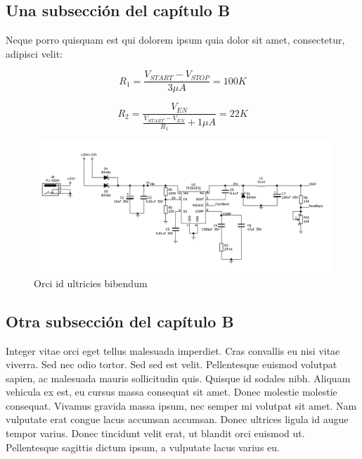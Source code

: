 \subsection{Una subsecci\'on del cap\'itulo B}		
Neque porro quisquam est qui dolorem ipsum quia dolor sit amet, consectetur, adipisci velit:
		
\begin{equation}
	R_{1} = \frac{V_{START} - V_{STOP}}{3 \mu A} = 100K
\end{equation}
		
\begin{equation}
	R_{2} = \frac{V_{EN}}{\frac{V_{START} - V_{EN}}{R_{1}} + 1 \mu A} = 22K
\end{equation}

\begin{figure}[h]
    \centering
    \includegraphics[width=\textwidth]{figures/chapterB/fuente.png}
    \caption{Orci id ultricies bibendum}
    \label{B_fuente}
\end{figure}

\subsection{Otra subsecci\'on del cap\'itulo B}	

Integer vitae orci eget tellus malesuada imperdiet. Cras convallis eu nisi vitae viverra. Sed nec odio tortor. Sed sed est velit. Pellentesque euismod volutpat sapien, ac malesuada mauris sollicitudin quis. Quisque id sodales nibh. Aliquam vehicula ex est, eu cursus massa consequat sit amet. Donec molestie molestie consequat. Vivamus gravida massa ipsum, nec semper mi volutpat sit amet. Nam vulputate erat congue lacus accumsan accumsan. Donec ultrices ligula id augue tempor varius. Donec tincidunt velit erat, ut blandit orci euismod ut. Pellentesque sagittis dictum ipsum, a vulputate lacus varius eu.	
